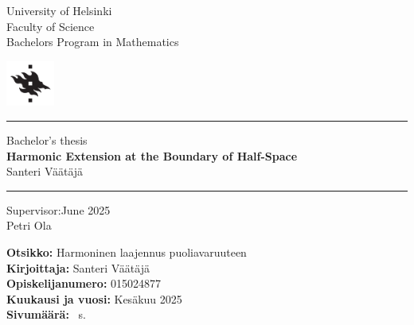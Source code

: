 \documentclass[a4paper, 11pt]{report}
\theoremstyle{plain}
\theoremstyle{definition}
\theoremstyle{remark}
\begin{document}
%
%
\begin{titlepage}

\noindent
\begin{minipage}[b]{\textwidth-45pt}
University of Helsinki\\
Faculty of Science\\
Bachelors Program in Mathematics
\end{minipage}
\hfill\includegraphics[width=45pt]{HYlogo.pdf}

\vspace{4pt}\hrule\vfill

\begin{center}
Bachelor's thesis\\[8pt]

{\huge\bfseries Harmonic Extension at the Boundary of Half-Space}\\[8pt]

Santeri Väätäjä
\end{center}

\vfill\hrule\vspace{4pt}

\noindent
Supervisor:\hfill June 2025\\
Petri Ola\\
\end{titlepage}

%
%
\cleardoublepage

\noindent\textbf{Otsikko:} Harmoninen laajennus puoliavaruuteen\\ %
\textbf{Kirjoittaja:} Santeri Väätäjä\\ %
\textbf{Opiskelijanumero:} 015024877 \\
\textbf{Kuukausi ja vuosi:} Kesäkuu 2025\\ %
\textbf{Sivumäärä:} \pageref*{LastPage}~s.\\[1em] %
\end{document}
